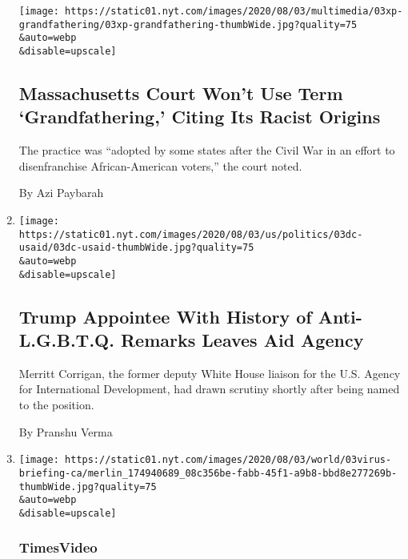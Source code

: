 \begin{enumerate}
  \texttt{[image: https://static01.nyt.com/images/2020/08/03/multimedia/03xp-grandfathering/03xp-grandfathering-thumbWide.jpg?quality=75\\\&auto=webp\\\&disable=upscale]}

  \hypertarget{massachusetts-court-wont-use-term-grandfathering-citing-its-racist-origins}{%
  \subsection{Massachusetts Court Won't Use Term `Grandfathering,'
  Citing Its Racist
  Origins}\label{massachusetts-court-wont-use-term-grandfathering-citing-its-racist-origins}}

  The practice was ``adopted by some states after the Civil War in an
  effort to disenfranchise African-American voters,'' the court noted.

  By Azi Paybarah
\item
  \href{/2020/08/03/us/politics/merritt-corrigan-usaid.html}{}

  \texttt{[image: https://static01.nyt.com/images/2020/08/03/us/politics/03dc-usaid/03dc-usaid-thumbWide.jpg?quality=75\\\&auto=webp\\\&disable=upscale]}

  \hypertarget{trump-appointee-with-history-of-anti-lgbtq-remarks-leaves-aid-agency}{%
  \subsection{Trump Appointee With History of Anti-L.G.B.T.Q. Remarks
  Leaves Aid
  Agency}\label{trump-appointee-with-history-of-anti-lgbtq-remarks-leaves-aid-agency}}

  Merritt Corrigan, the former deputy White House liaison for the U.S.
  Agency for International Development, had drawn scrutiny shortly after
  being named to the position.

  By Pranshu Verma
\item
  \href{/video/us/100000007271181/california-virus-cases-trend-down.html}{}

  \texttt{[image: https://static01.nyt.com/images/2020/08/03/world/03virus-briefing-ca/merlin\_174940689\_08c356be-fabb-45f1-a9b8-bbd8e277269b-thumbWide.jpg?quality=75\\\&auto=webp\\\&disable=upscale]}

  \hypertarget{timesvideo}{%
  \subsubsection{TimesVideo}\label{timesvideo}}

  \hypertarget{coronavirus-cases-trending-down-in-california-governor-says}{%
}
\end{enumerate}
